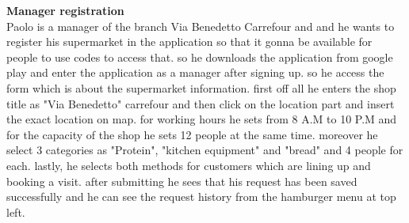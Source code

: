 \begin{SC}[wide]
    \item \textbf{Manager registration} \\
    Paolo is a manager of the branch Via Benedetto Carrefour and and he wants to register his supermarket in the application so that it gonna be available for people to use codes to access that.  so he downloads the application from google play and enter the application as a manager after signing up. so he access the form which is about the supermarket information. first off all he enters the shop title as "Via Benedetto" carrefour and then click on the location part and insert the exact location on map. for working hours he sets from 8 A.M to 10 P.M and for the capacity of the shop he sets 12 people at the same time. moreover he select 3 categories as "Protein", "kitchen equipment" and "bread" and 4 people for each. lastly, he selects both methods for customers which are lining up and booking a visit. after submitting he sees that his request has been saved successfully and he can see the request history from the hamburger menu at top left.\\
\end{SC}
